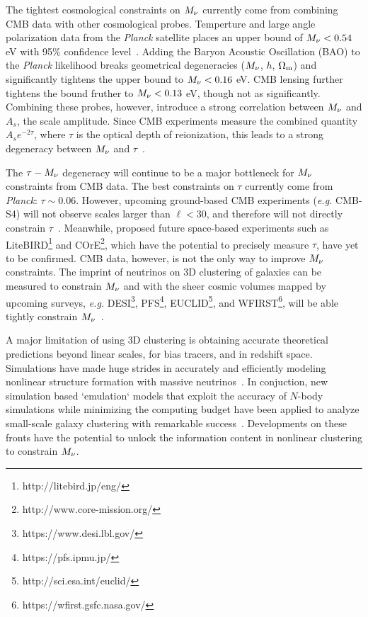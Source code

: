The tightest cosmological constraints on $M_\nu$ currently come from 
combining CMB data with other cosmological probes. Temperture and large 
angle polarization data from the {\em Planck} satellite places an upper 
bound of $M_\nu < 0.54$ eV with 95\% confidence level~\citep{planckcollaboration2018}. 
Adding the Baryon Acoustic Oscillation (BAO) to the {\em Planck} 
likelihood breaks geometrical degeneracies ($M_\nu$, $h$, $\Omega_{\rm m}$) 
and significantly tightens the upper bound to $M_\nu < 0.16$ eV. CMB 
lensing further tightens the bound fruther to $M_\nu < 0.13$ eV, though 
not as significantly. Combining these probes, however, introduce a strong 
correlation between $M_\nu$ and $A_s$, the scale amplitude. Since CMB 
experiments measure the combined quantity $A_s e^{-2\tau}$, where 
$\tau$ is the optical depth of reionization, this leads to a strong 
degeneracy between $M_\nu$ and $\tau$~\citep{allison2015, liu2016, archidiacono2017}. 

The $\tau-M_\nu$ degeneracy will continue to be a major bottleneck 
for $M_\nu$ constraints from CMB data. The best constraints on $\tau$ 
currently come from {\em Planck}: $\tau\sim0.06$. However, upcoming 
ground-based CMB experiments ({\em e.g.} CMB-S4) will not observe scales 
larger than $\ell < 30$, and therefore will not directly constrain 
$\tau$~\citep{abazajian2016}. Meanwhile, proposed future space-based 
experiments such as LiteBIRD\footnote{http://litebird.jp/eng/} and 
COrE\footnote{http://www.core-mission.org/}, which have the potential 
to precisely measure $\tau$, have yet to be confirmed. CMB data, however, 
is not the only way to improve $M_\nu$ constraints. The imprint of 
neutrinos on 3D clustering of galaxies can be measured to constrain 
$M_\nu$ and with the sheer cosmic volumes mapped by upcoming surveys, 
\emph{e.g.} DESI\footnote{https://www.desi.lbl.gov/}, PFS\footnote{https://pfs.ipmu.jp/}, 
EUCLID\footnote{http://sci.esa.int/euclid/}, and WFIRST\footnote{https://wfirst.gsfc.nasa.gov/}, 
will be able tightly constrain 
$M_\nu$~\citep{audren2013, font-ribera2014, petracca2016, sartoris2016, boyle2018}.

A major limitation of using 3D clustering is obtaining accurate theoretical 
predictions beyond linear scales, for bias tracers, and in redshift space. 
Simulations have made huge strides in accurately and efficiently modeling 
nonlinear structure formation with massive neutrinos~\citep[\emph{e.g.}][]{brandbyge2008, 
villaescusa-navarro2013, castorina2015, adamek2017, emberson2017, villaescusa-navarro2018}. 
In conjuction, new simulation based `emulation` models that exploit the 
accuracy of $N$-body simulations while minimizing the computing budget 
have been applied to analyze small-scale galaxy clustering with remarkable 
success~\citep[\emph{e.g.}][]{heitmann2009, kwan2015, euclidcollaboration2018, mcclintock2018, zhai2018, wibking2019}. 
Developments on these fronts have the potential to unlock the information 
content in nonlinear clustering to constrain $M_\nu$. 

